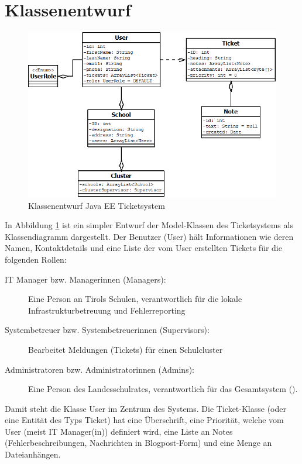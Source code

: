 \newpage
\section{Klassenentwurf}

\begin{figure}[h]
	\centering
	\includegraphics[scale=0.6]{figures/klassenentwurf_java_ticketsys_export.png}
	\caption{Klassenentwurf Java EE Ticketsystem}
	\label{Abb_Klassendesign_TicketSys}
\end{figure}

In Abbildung \ref{Abb_Klassendesign_TicketSys} ist ein simpler Entwurf der Model-Klassen des Ticketsystems als Klassendiagramm dargestellt. Der Benutzer (User) hält Informationen wie deren Namen, Kontaktdetails und eine Liste der vom User erstellten Tickets für die folgenden Rollen:

\begin{description}
	\item[IT Manager bzw. Managerinnen (Managers):] Eine Person an Tirols Schulen, verantwortlich für die lokale Infrastrukturbetreuung und Fehlerreporting
	\item[Systembetreuer bzw. Systembetreuerinnen (Supervisors):] Bearbeitet Meldungen (Tickets) für einen Schulcluster
	\item[Administratoren bzw. Administratorinnen (Admins):] Eine Person des Landesschulrates, verantwortlich für das Gesamtsystem (\getHammerl).
\end{description}

Damit steht die Klasse User im Zentrum des Systems. Die Ticket-Klasse (oder eine Entität des Typs Ticket) hat eine Überschrift, eine Priorität, welche vom User (meist IT Manager(in)) definiert wird, eine Liste an Notes (Fehlerbeschreibungen, Nachrichten in Blogpost-Form) und eine Menge an Dateianhängen.